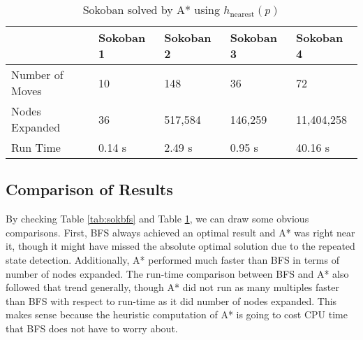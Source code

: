 \documentclass{article}[12pt]
\begin{document}
	\begin{table}[ht]
   \centering
   \begin{tabular}{l | l | l | l | l }
   \hline
    & Sokoban 1 & Sokoban 2 & Sokoban 3 & Sokoban 4\\
    \hline \hline 
   Number of Moves & 10 & 148 & 36 & 72 \\
   Nodes Expanded & 36 & 517,584 & 146,259 & 11,404,258\\
   Run Time & 0.14 s & 2.49 s & 0.95 s & 40.16 s\\
   \hline
   \end{tabular}
   \caption{Sokoban solved by A* using $h_{\text{nearest}}(p)$} \label{tab:sokastar}
   \end{table}
   
   
   \subsection{Comparison of Results}
   By checking Table \ref{tab:sokbfs} and Table \ref{tab:sokastar}, we can draw some obvious comparisons. First, BFS always achieved an optimal result and A* was right near it, though it might have missed the absolute optimal solution due to the repeated state detection. Additionally, A* performed much faster than BFS in terms of number of nodes expanded. The run-time comparison between BFS and A* also followed that trend generally, though A* did not run as many multiples faster than BFS with respect to run-time as it did number of nodes expanded. This makes sense because the heuristic computation of A* is going to cost CPU time that BFS does not have to worry about.  

\newpage
\end{document}
